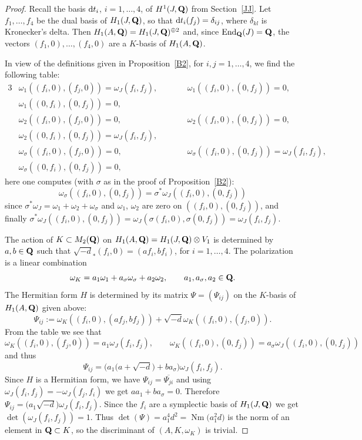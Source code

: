 \documentclass[10pt,a4paper]{amsart}
\numberwithin{equation}{section}
\begin{document}
\begin{proof}
Recall the basis ${\rm d} t_i$, $i=1,\dots, 4$, of $H^1(J,{\bf Q})$ from Section~\ref{JJ}. Let
$f_1,\dots,f_4$ be the dual basis of $H_1(J,{\bf Q})$, so that
${\rm d} t_i(f_j)=\delta_{ij}$, where $\delta_{kl}$ is
Kronecker's delta.
Then $H_1(A,{\bf Q})=H_1(J,{\bf Q})^{\oplus 2}$ and, since $\operatorname{End}_{\bf Q}(J)={\bf Q}$, the vectors
$(f_1,0),\dots,(f_4,0)$ are a $K$-basis of $H_1(A,{\bf Q})$.

In view of the definitions given in Proposition~\ref{B2},
for $i,j=1,\dots,4$, we find the following table:
\begin{alignat*}{3}
& \omega_1((f_i,0),(f_j,0))=\omega_J(f_i,f_j),\qquad && \omega_1((f_i,0),(0,f_j))=0,&\\
& \omega_1((0,f_i),(0,f_j))=0,&&&\\
&\omega_2((f_i,0),(f_j,0))=0,\qquad &&\omega_2((f_i,0),(0,f_j))=0,&\\
& \omega_2((0,f_i),(0,f_j))=\omega_J(f_i,f_j),&&& \\
& \omega_\sigma((f_i,0),(f_j,0))=0,\qquad && \omega_\sigma((f_i,0),(0,f_j))=\omega_J(f_i,f_j),&\\
& \omega_\sigma((0,f_i),(0,f_j))=0,&&&
\end{alignat*}
here one computes (with $\sigma$ as in the proof of Proposition~\ref{B2}):
\[
\omega_\sigma((f_i,0),(0,f_j)) = \sigma^*\omega_J((f_i,0),(0,f_j))
\]
since $\sigma^*\omega_J=\omega_1+\omega_2+\omega_\sigma$ and
$\omega_1$, $\omega_2$ are zero on $((f_i,0),(0,f_j))$,
and finally $\sigma^*\omega_J((f_i,0),(0,f_j))\!=\!\omega_J(\sigma(f_i,0),\sigma(0,f_j))=\omega_J(f_i,f_j)$.

The action of $K\subset M_2({\bf Q})$ on $H_1(A,{\bf Q})=H_1(J,{\bf Q})\otimes V_1$ is determined by
$a,b\in{\bf Q}$ such that $\sqrt{-d}_*(f_i,0)=(af_i,bf_i)$,
for $i=1,\dots,4$.
The polarization is a linear combination
\[
\omega_K = a_1\omega_1+a_\sigma \omega_\sigma+a_2\omega_2,\qquad a_1,a_\sigma,a_2\in{\bf Q}.
\]
The Hermitian form $H$ is determined by its matrix $\Psi=(\Psi_{ij})$
on the $K$-basis of $H_1(A,{\bf Q})$ given above:
\[
\Psi_{ij} := \omega_K((f_i,0),(af_j,bf_j)) + \sqrt{-d}\omega_K((f_i,0),(f_j,0)).
\]
From the table we see that
\[\omega_K((f_i,0),(f_j,0))=a_1\omega_J(f_i,f_j),\qquad
\omega_K((f_i,0),(0,f_j))=a_\sigma \omega_J((f_i,0),(0,f_j))
\]
and thus
\[
\Psi_{ij} = \big(a_1\big(a+\sqrt{-d}\big)+ba_\sigma\big)\omega_J(f_i,f_j).
\]
Since $H$ is a Hermitian form, we have $\Psi_{ij}=\overline{\Psi_{ji}}$ and using
$\omega_J(f_i,f_j)=-\omega_J(f_j,f_i)$ we get $aa_1+ba_\sigma=0$.
Therefore $\Psi_{ij}=\big(a_1\sqrt{-d}\big)\omega_J(f_i,f_j)$. Since the $f_i$ are a symplectic basis
of $H_1(J,{\bf Q})$ we get $\det(\omega_J(f_i,f_j))=1$. Thus $\det(\Psi)=a_1^4d^2=
\operatorname{Nm}\big(a_1^2d\big)$ is the norm of an element in ${\bf Q}\subset K$, so the discriminant of
$(A,K,\omega_K)$ is trivial.
\end{proof}
\end{document}

